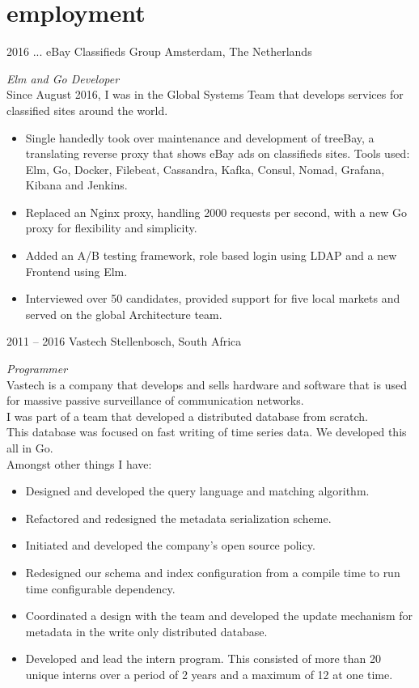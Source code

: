 \documentclass[print]{friggeri-cv} %
\begin{document}
\section{employment}
\begin{entrylist}

\entry
{2016 ...}
{eBay Classifieds Group}
{Amsterdam, The Netherlands}
{\emph{Elm and Go Developer} \\
Since August 2016, I was in the Global Systems Team that develops services for classified sites around the world.
\begin{itemize}
\item Single handedly took over maintenance and development of treeBay, a translating reverse proxy that shows eBay ads on classifieds sites.
      Tools used: Elm, Go, Docker, Filebeat, Cassandra, Kafka, Consul, Nomad, Grafana, Kibana and Jenkins.
\item Replaced an Nginx proxy, handling 2000 requests per second, with a new Go proxy for flexibility and simplicity.
\item Added an A/B testing framework, role based login using LDAP and a new Frontend using Elm.
\item Interviewed over 50 candidates, provided support for five local markets and served on the global Architecture team.
\end{itemize}
}

\entry
{2011 -- 2016}
{Vastech}
{Stellenbosch, South Africa}
{\emph{Programmer} \\
Vastech is a company that develops and sells hardware and software that is used for massive passive surveillance of communication networks. \\
I was part of a team that developed a distributed database from scratch. \\
This database was focused on fast writing of time series data.  We developed this all in Go. \\
Amongst other things I have: \\
\begin{itemize}
\item Designed and developed the query language and matching algorithm.
\item Refactored and redesigned the metadata serialization scheme.
\item Initiated and developed the company's open source policy.
\item Redesigned our schema and index configuration from a compile time to run time configurable dependency.
\item Coordinated a design with the team and developed the update mechanism for metadata in the write only distributed database.
\item Developed and lead the intern program. This consisted of more than 20 unique interns over a period of 2 years and a maximum of 12 at one time.
\end{itemize}
}


\end{entrylist}
\end{document}
